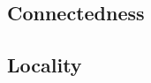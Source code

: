 \documentclass[11pt]{article}
\begin{document}
\subsection{Connectedness}


\subsection{Locality}





\end{document}
